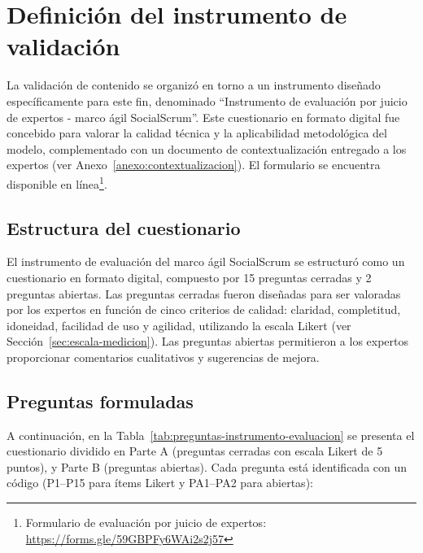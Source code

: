 \section{Definición del instrumento de validación}
La validación de contenido se organizó en torno a un instrumento diseñado específicamente para este fin, denominado ``Instrumento de evaluación por juicio de expertos - marco ágil SocialScrum''. Este cuestionario en formato digital fue concebido para valorar la calidad técnica y la aplicabilidad metodológica del modelo, complementado con un documento de contextualización entregado a los expertos (ver Anexo~\ref{anexo:contextualizacion}). El formulario se encuentra disponible en línea\footnote{Formulario de evaluación por juicio de expertos: \url{https://forms.gle/59GBPFy6WAi2s2j57}}.

\subsection{Estructura del cuestionario}
El instrumento de evaluación del marco ágil SocialScrum se estructuró como un cuestionario en formato digital, compuesto por 15 preguntas cerradas y 2 preguntas abiertas. Las
preguntas cerradas fueron diseñadas para ser valoradas por los expertos en función de cinco criterios de calidad: claridad, completitud, idoneidad, facilidad de uso y agilidad, utilizando la escala Likert (ver Sección~\ref{sec:escala-medicion}). Las preguntas abiertas permitieron a los expertos proporcionar comentarios cualitativos y sugerencias de mejora.

\subsection{Preguntas formuladas}
A continuación, en la Tabla~\ref{tab:preguntas-instrumento-evaluacion} se presenta el cuestionario dividido en Parte A (preguntas cerradas con escala Likert de 5 puntos), y Parte B (preguntas abiertas). Cada pregunta está identificada con un código (P1–P15 para ítems Likert y PA1–PA2 para abiertas):

\smallskip

\begingroup
\scriptsize
\renewcommand{\arraystretch}{1.4}
\setlength{\tabcolsep}{4pt}
\setlength{\LTleft}{0pt}
\setlength{\LTright}{0pt}

